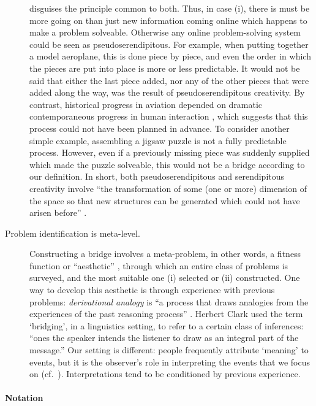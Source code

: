 \begin{description}
   disguises the principle common to both.  Thus, in case (i), there is
   must be more going on than just new information coming online which
   happens to make a problem solveable.  Otherwise any online
   problem-solving system could be seen as pseudoserendipitous.  For
   example, when putting together a model aeroplane, this is done piece
   by piece, and even the order in which the pieces are put into place
   is more or less predictable.  It would not be said that either the
   last piece added, nor any of the other pieces that were added along
   the way, was the result of pseudoserendipitous creativity.  By
   contrast, historical progress in aviation depended on dramatic
   contemporaneous progress in human interaction
   \cite[p.~292]{spenser2008airplane}, which suggests that this process
   could not have been planned in advance.  To consider another simple
   example, assembling a jigsaw puzzle is not a fully predictable
   process.  However, even if a previously missing piece was suddenly
   supplied which made the puzzle solveable, this would not be a bridge
   according to our definition.  In short, both pseudoserendipitous and
   serendipitous creativity involve ``the transformation of some (one
   or more) dimension of the space so that new structures can be
   generated which could not have arisen before''
   \cite[p.~348]{boden1998creativity}.
 \item[Problem identification is meta-level.]  Constructing a bridge
   involves a meta-problem, in other words, a fitness function or
   ``aesthetic'' \cite{pease2011computational}, through which an entire
   class of problems is surveyed, and the most suitable one (i)
   selected or (ii) constructed.  One way to develop this aesthetic is
   through experience with previous problems: \emph{derivational
     analogy} is ``a process that draws analogies from the experiences
   of the past reasoning process'' \cite{Melis98anargument}. Herbert
   Clark \cite[p.~169]{Clark:1975:BRI:980190.980237} used the term
   `bridging', in a linguistics setting, to refer to a certain class of
   inferences: ``ones the speaker intends the listener to draw as an
   integral part of the message.''  Our setting is different: people
   frequently attribute `meaning' to events, but it is the observer's
   role in interpreting the events that we focus on
   (cf.~\cite{dennett_2013}).  Interpretations tend to be conditioned
   by previous experience.
 \end{description}

 \paragraph{\textbf{\upshape Notation}}

